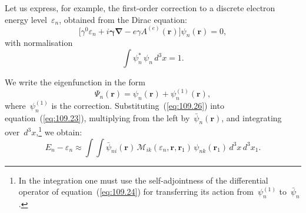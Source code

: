 Let us express, for example, the first-order correction to a discrete electron energy level~$\varepsilon_n$, obtained from the Dirac equation:
\begin{equation}
\bigl[\gamma^0\varepsilon_n + i\boldsymbol{\gamma}\boldsymbol{\nabla} - e\gamma A^{(e)}(\mathbf{r})\bigr]\psi_n(\mathbf{r}) = 0,
\label{eq:109.24}
\end{equation}
with normalisation
\begin{equation}
\int\!\psi_n^*\,\psi_n\,d^3x = 1.
\label{eq:109.25}
\end{equation}


We write the eigenfunction in the form
\begin{equation}
\Psi_n(\mathbf{r}) = \psi_n(\mathbf{r}) + \psi_n^{(1)}(\mathbf{r}),
\label{eq:109.26}
\end{equation}
where~$\psi_n^{(1)}$ is the correction. Substituting~(\ref{eq:109.26}) into equation~(\ref{eq:109.23}), multiplying from the left by~$\bar{\psi}_n(\mathbf{r})$, and integrating over~$d^3x$,\footnote{In the integration one must use the self-adjointness of the differential operator of equation~(\ref{eq:109.24}) for transferring its action from~$\psi_n^{(1)}$ to~$\bar{\psi}_n$.} we obtain:
\begin{equation}
E_n - \varepsilon_n \approx \int\!\!\int\bar{\psi}_{ni}(\mathbf{r})\,\mathcal{M}_{ik}(\varepsilon_n, \mathbf{r}, \mathbf{r}_1)\,\psi_{nk}(\mathbf{r}_1)\,d^3x\,d^3x_1.
\label{eq:109.27}
\end{equation}

